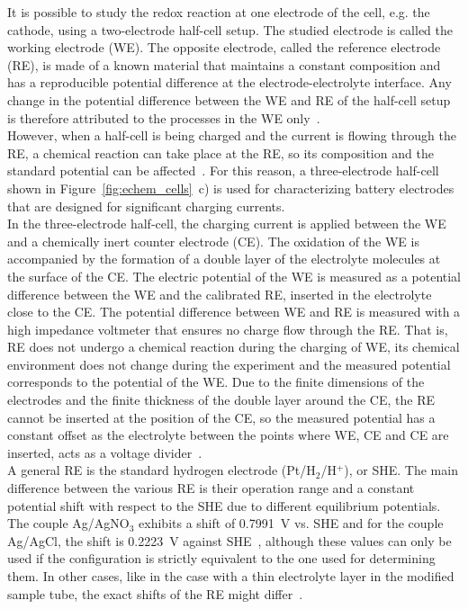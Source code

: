 It is possible to study the redox reaction at one electrode of the cell, e.g. the cathode, using a two-electrode half-cell setup. The studied electrode is called the working electrode (WE). The opposite electrode, called the reference electrode (RE), is made of a known material that maintains a constant composition and has a reproducible potential difference at the electrode-electrolyte interface. Any change in the potential difference between the WE and RE of the half-cell setup is therefore attributed to the processes in the WE only~\cite{Bard_book}.\\
However, when a half-cell is being charged and the current is flowing through the RE, a chemical reaction can take place at the RE, so its composition and the standard potential can be affected~\cite{Bard_book,DOM}. For this reason, a three-electrode half-cell shown in Figure~\ref{fig:echem_cells}~c) is used for characterizing battery electrodes that are designed for significant charging currents.\\

In the three-electrode half-cell, the charging current is applied between the WE and a chemically inert counter electrode (CE). The oxidation of the WE is accompanied by the formation of a double layer of the electrolyte molecules at the surface of the CE. The electric potential of the WE is measured as a potential difference between the WE and the calibrated RE, inserted in the electrolyte close to the CE. The potential difference between WE and RE is measured with a high impedance voltmeter that ensures no charge flow through the RE. That is, RE does not undergo a chemical reaction during the charging of WE, its chemical environment does not change during the experiment and the measured potential corresponds to the potential of the WE. Due to the finite dimensions of the electrodes and the finite thickness of the double layer around the CE, the RE cannot be inserted at the position of the CE, so the measured potential has a constant offset as the electrolyte between the points where WE, CE and CE are inserted, acts as a voltage divider~\cite{Bard_book}.\\

A general RE is the standard hydrogen electrode (Pt/H$_2$/H$^+$), or SHE. The main difference between the various RE is their operation range and a constant potential shift with respect to the SHE due to different equilibrium potentials. The couple Ag/AgNO$_3$ exhibits a shift of 0.7991~V vs. SHE and for the couple Ag/AgCl, the shift is 0.2223~V against SHE~\cite{Bard_book,DOM}, although these values can only be used if the configuration is strictly equivalent to the one used for determining them. In other cases, like in the case with a thin electrolyte layer in the modified sample tube, the exact shifts of the RE might differ~\cite{DOM}.\\

